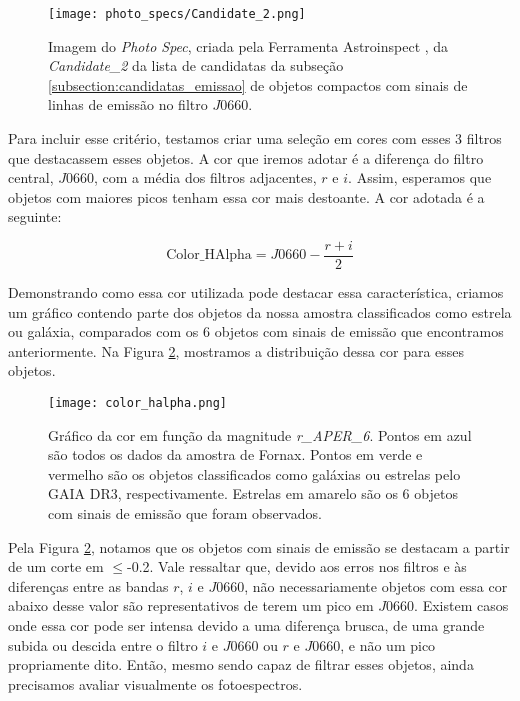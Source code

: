 \begin{figure}[!ht]
    \begin{center}
    \texttt{[image: photo\_specs/Candidate\_2.png]}
    \caption[]{Imagem do \textit{Photo Spec}, criada pela Ferramenta Astroinspect \cite{astroinspect}, da \textit{Candidate\_2} da lista de candidatas da subseção \ref{subsection:candidatas_emissao} de objetos compactos com sinais de linhas de emissão no filtro $J0660$.}
    \label{ex_photospec_f600}
    \end{center}
\end{figure}

Para incluir esse critério, testamos criar uma seleção em cores com esses 3 filtros que destacassem esses objetos. A cor que iremos adotar é a diferença do filtro central, $J0660$, com a média dos filtros adjacentes, $r$ e $i$. Assim, esperamos que objetos com maiores picos tenham essa cor mais destoante. A cor adotada é a seguinte:

\begin{equation}
    \text{Color\_HAlpha} = J0660 - \frac{r + i}{2}
    \label{equantion_halpha_color}
\end{equation}

Demonstrando como essa cor utilizada pode destacar essa característica, criamos um gráfico contendo parte dos objetos da nossa amostra classificados como estrela ou galáxia, comparados com os 6 objetos com sinais de emissão que encontramos anteriormente. Na Figura \ref{color_halpha}, mostramos a distribuição dessa cor para esses objetos.

\begin{figure}[!ht]
    \begin{center}
    \texttt{[image: color\_halpha.png]}
    \caption[]{Gráfico da cor  em função da magnitude \textit{r\_APER\_6}. Pontos em azul são todos os dados da amostra de Fornax. Pontos em verde e vermelho são os objetos classificados como galáxias ou estrelas pelo GAIA DR3, respectivamente. Estrelas em amarelo são os 6 objetos com sinais de emissão que foram observados.}
    \label{color_halpha}
    \end{center}
\end{figure}

Pela Figura \ref{color_halpha}, notamos que os objetos com sinais de emissão se destacam a partir de um corte em $\leq$-0.2. Vale ressaltar que, devido aos erros nos filtros e às diferenças entre as bandas $r$, $i$ e $J0660$, não necessariamente objetos com essa cor abaixo desse valor são representativos de terem um pico em $J0660$. Existem casos onde essa cor pode ser intensa devido a uma diferença brusca, de uma grande subida ou descida entre o filtro $i$ e $J0660$ ou $r$ e $J0660$, e não um pico propriamente dito. Então, mesmo sendo capaz de filtrar esses objetos, ainda precisamos avaliar visualmente os fotoespectros.

